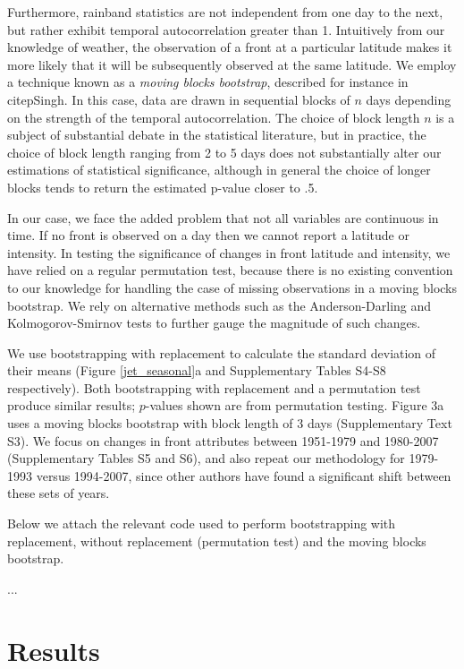 	Furthermore, rainband statistics are not independent from one day to the next, but rather exhibit temporal autocorrelation greater than 1. Intuitively from our knowledge of weather, the observation of a front at a particular latitude makes it more likely that it will be subsequently observed at the same latitude. We employ a technique known as a \textit{moving blocks bootstrap}, described for instance in citep{Singh}. In this case, data are drawn in sequential blocks of $n$ days depending on the strength of the temporal autocorrelation. The choice of block length $n$ is a subject of substantial debate in the statistical literature, but in practice, the choice of block length ranging from 2 to 5 days does not substantially alter our estimations of statistical significance, although in general the choice of longer blocks tends to return the estimated p-value closer to .5.
	
	In our case, we face the added problem that not all variables are continuous in time. If no front is observed on a day then we cannot report a latitude or intensity. In testing the significance of changes in front latitude and intensity, we have relied on a regular permutation test, because there is no existing convention to our knowledge for handling the case of missing observations in a moving blocks bootstrap. We rely on alternative methods such as the Anderson-Darling and Kolmogorov-Smirnov tests to further gauge the magnitude of such changes.
	
	We use bootstrapping with replacement to calculate the standard deviation of their means (Figure \ref{jet_seasonal}a and Supplementary Tables S4-S8 respectively). Both bootstrapping with replacement and a permutation test produce similar results; $p$-values shown are from permutation testing. Figure 3a uses a moving blocks bootstrap with block length of 3 days (Supplementary Text S3). We focus on changes in front attributes between 1951-1979 and 1980-2007 (Supplementary Tables S5 and S6), and also repeat our methodology for 1979-1993 versus 1994-2007, since other authors have found a significant shift between these sets of years.

	Below we attach the relevant code used to perform bootstrapping with replacement, without replacement (permutation test) and the moving blocks bootstrap.

...



\section{Results}

